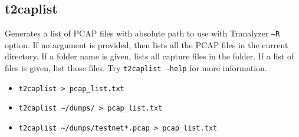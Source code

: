 \documentclass[documentation]{subfiles}
\begin{document}
\subsection{t2caplist}\label{t2caplist}
Generates a list of PCAP files with absolute path to use with Tranalyzer {\tt --R} option.
If no argument is provided, then lists all the PCAP files in the current directory.
If a folder name is given, lists all capture files in the folder.
If a list of files is given, list those files.
Try {\tt t2caplist --help} for more information.
\begin{itemize}
    \item {\tt t2caplist > pcap\_list.txt}
    \item {\tt t2caplist \textasciitilde/dumps/ > pcap\_list.txt}
    \item {\tt t2caplist \textasciitilde/dumps/testnet*.pcap > pcap\_list.txt}
\end{itemize}
\end{document}
